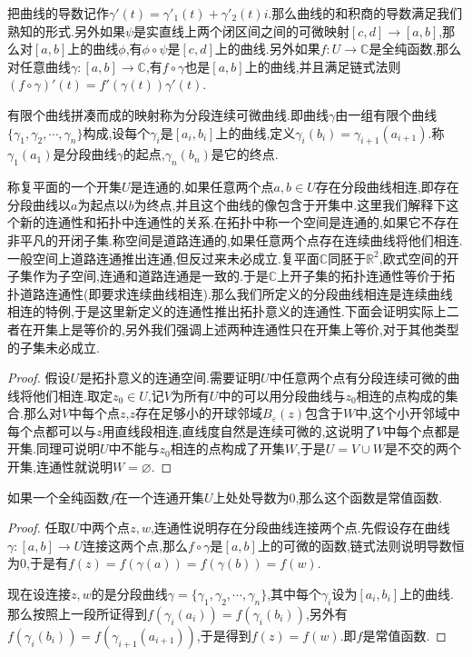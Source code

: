 把曲线的导数记作$\gamma'(t)=\gamma'_1(t)+\gamma'_2(t)i$.那么曲线的和积商的导数满足我们熟知的形式.另外如果$\psi$是实直线上两个闭区间之间的可微映射$[c,d]\to[a,b]$,那么对$[a,b]$上的曲线$\phi$,有$\phi\circ\psi$是$[c,d]$上的曲线.另外如果$f:U\to\mathbb{C}$是全纯函数,那么对任意曲线$\gamma:[a,b]\to\mathbb{C}$,有$f\circ\gamma$也是$[a,b]$上的曲线,并且满足链式法则$(f\circ\gamma)'(t)=f'(\gamma(t))\gamma'(t)$.

有限个曲线拼凑而成的映射称为分段连续可微曲线.即曲线$\gamma$由一组有限个曲线$\{\gamma_1,\gamma_2,\cdots,\gamma_n\}$构成,设每个$\gamma_i$是$[a_i,b_i]$上的曲线,定义$\gamma_i(b_i)=\gamma_{i+1}(a_{i+1})$.称$\gamma_1(a_1)$是分段曲线$\gamma$的起点,$\gamma_n(b_n)$是它的终点.

称复平面的一个开集$U$是连通的,如果任意两个点$a,b\in U$存在分段曲线相连,即存在分段曲线以$a$为起点以$b$为终点,并且这个曲线的像包含于开集中.这里我们解释下这个新的连通性和拓扑中连通性的关系.在拓扑中称一个空间是连通的,如果它不存在非平凡的开闭子集.称空间是道路连通的,如果任意两个点存在连续曲线将他们相连.一般空间上道路连通推出连通,但反过来未必成立.复平面$\mathbb{C}$同胚于$\mathbb{R}^2$,欧式空间的开子集作为子空间,连通和道路连通是一致的.于是$\mathbb{C}$上开子集的拓扑连通性等价于拓扑道路连通性(即要求连续曲线相连).那么我们所定义的分段曲线相连是连续曲线相连的特例,于是这里新定义的连通性推出拓扑意义的连通性.下面会证明实际上二者在开集上是等价的,另外我们强调上述两种连通性只在开集上等价,对于其他类型的子集未必成立.
\begin{proof}
	
	假设$U$是拓扑意义的连通空间.需要证明$U$中任意两个点有分段连续可微的曲线将他们相连.取定$z_0\in U$,记$V$为所有$U$中的可以用分段曲线与$z_0$相连的点构成的集合.那么对$V$中每个点$z$,$z$存在足够小的开球邻域$B_{\varepsilon}(z)$包含于$W$中,这个小开邻域中每个点都可以与$z$用直线段相连,直线度自然是连续可微的,这说明了$V$中每个点都是开集.同理可说明$U$中不能与$z_0$相连的点构成了开集$W$,于是$U=V\cup W$是不交的两个开集,连通性就说明$W=\varnothing$.
\end{proof}

如果一个全纯函数$f$在一个连通开集$U$上处处导数为0,那么这个函数是常值函数.
\begin{proof}
	
	任取$U$中两个点$z,w$,连通性说明存在分段曲线连接两个点.先假设存在曲线$\gamma:[a,b]\to U$连接这两个点,那么$f\circ\gamma$是$[a,b]$上的可微的函数,链式法则说明导数恒为0,于是有$f(z)=f(\gamma(a))=f(\gamma(b))=f(w)$.
	
	现在设连接$z,w$的是分段曲线$\gamma=\{\gamma_1,\gamma_2,\cdots,\gamma_n\}$,其中每个$\gamma_i$设为$[a_i,b_i]$上的曲线.那么按照上一段所证得到$f(\gamma_i(a_i))=f(\gamma_i(b_i))$,另外有$f(\gamma_i(b_i))=f(\gamma_{i+1}(a_{i+1}))$,于是得到$f(z)=f(w)$.即$f$是常值函数.
\end{proof}

